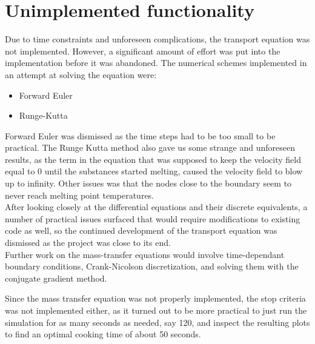\section{Unimplemented functionality}

Due to time constraints and unforeseen complications, the transport equation was
not implemented. However, a significant amount of effort was put into the implementation before it was 
abandoned. The numerical schemes implemented in an attempt at solving the
equation were:

\begin{itemize}
  \item Forward Euler
  \item Runge-Kutta
\end{itemize} 

Forward Euler was dismissed as the time steps had to be too small to be practical.
The Runge Kutta method also gave us some strange and unforeseen results, as the term in 
the equation that was supposed to keep the velocity field equal to $0$ until the substances
started melting, caused the velocity field to blow up to infinity. Other issues was that
the nodes close to the boundary seem to never reach melting point
temperatures.\\

After looking closely at the differential equations and their discrete equivalents, a number
of practical issues surfaced that would require modifications to existing code
as well, so the continued development of the transport equation was dismissed
as the project was close to its end.\\

Further work on the mass-transfer equations would involve time-dependant boundary conditions,
Crank-Nicolson discretization, and solving them with the conjugate gradient method.

Since the mass transfer equation was not properly implemented, the stop criteria was not 
implemented either, as it turned out to be more practical to just run the simulation for as 
many seconds as needed, say 120, and inspect the resulting plots to find an
optimal cooking time of about 50 seconds.
